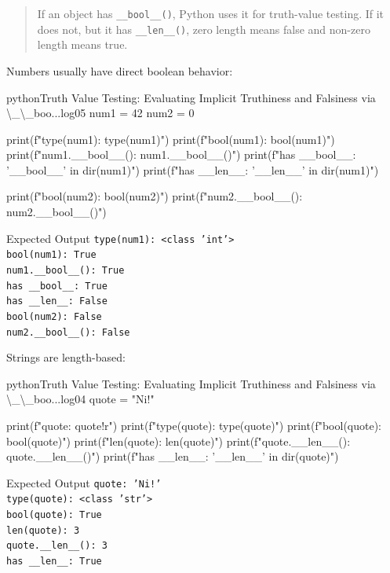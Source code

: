 \begin{quote}
If an object has \texttt{\_\_bool\_\_()}, Python uses it for truth-value testing. If it does not, but it has \texttt{\_\_len\_\_()}, zero length means false and non-zero length means true.
\end{quote}

Numbers usually have direct boolean behavior:

\begin{codebox}[]{python}{Truth Value Testing: Evaluating Implicit Truthiness and Falsiness via \textbackslash{}\_\textbackslash{}\_boo...}{log05}
num1 = 42
num2 = 0

print(f"type(num1): {type(num1)}")
print(f"bool(num1): {bool(num1)}")
print(f"num1.__bool__(): {num1.__bool__()}")
print(f"has __bool__: {'__bool__' in dir(num1)}")
print(f"has __len__: {'__len__' in dir(num1)}")

print(f"bool(num2): {bool(num2)}")
print(f"num2.__bool__(): {num2.__bool__()}")
\end{codebox}


\begin{iobox}{Expected Output}
\texttt{type(num1): <class 'int'>} \\
\texttt{bool(num1): True} \\
\texttt{num1.\_\_bool\_\_(): True} \\
\texttt{has \_\_bool\_\_: True} \\
\texttt{has \_\_len\_\_: False} \\
\texttt{bool(num2): False} \\
\texttt{num2.\_\_bool\_\_(): False} \\
\end{iobox}


Strings are length-based:

\begin{codebox}[]{python}{Truth Value Testing: Evaluating Implicit Truthiness and Falsiness via \textbackslash{}\_\textbackslash{}\_boo...}{log04}
quote = "Ni!"

print(f"quote: {quote!r}")
print(f"type(quote): {type(quote)}")
print(f"bool(quote): {bool(quote)}")
print(f"len(quote): {len(quote)}")
print(f"quote.__len__(): {quote.__len__()}")
print(f"has __len__: {'__len__' in dir(quote)}")
\end{codebox}


\begin{iobox}{Expected Output}
\texttt{quote: 'Ni!'} \\
\texttt{type(quote): <class 'str'>} \\
\texttt{bool(quote): True} \\
\texttt{len(quote): 3} \\
\texttt{quote.\_\_len\_\_(): 3} \\
\texttt{has \_\_len\_\_: True} \\
\end{iobox}


